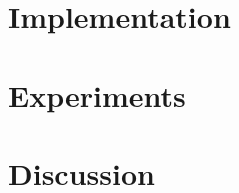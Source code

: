 \section{Implementation}
\label{sec:star-impl}


\section{Experiments}
\label{sec:star-exp}


\section{Discussion}


% 
